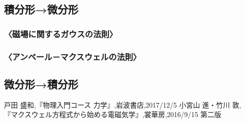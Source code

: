 \documentclass[10pt,b5paper,papersize,dvipdfmx]{jsbook}
\begin{document}
\subsection{積分形→微分形}
\subsubsection{〈磁場に関するガウスの法則〉}

\subsubsection{〈アンペール－マクスウェルの法則〉}

\subsection{微分形→積分形}

\begin{thebibliography}{9}
 戸田 盛和,『物理入門コース 力学』,岩波書店,2017/12/5
 小宮山 進・竹川 敦,『マクスウェル方程式から始める電磁気学』,裳華房,2016/9/15 第二版

\end{thebibliography}

\end{document}
